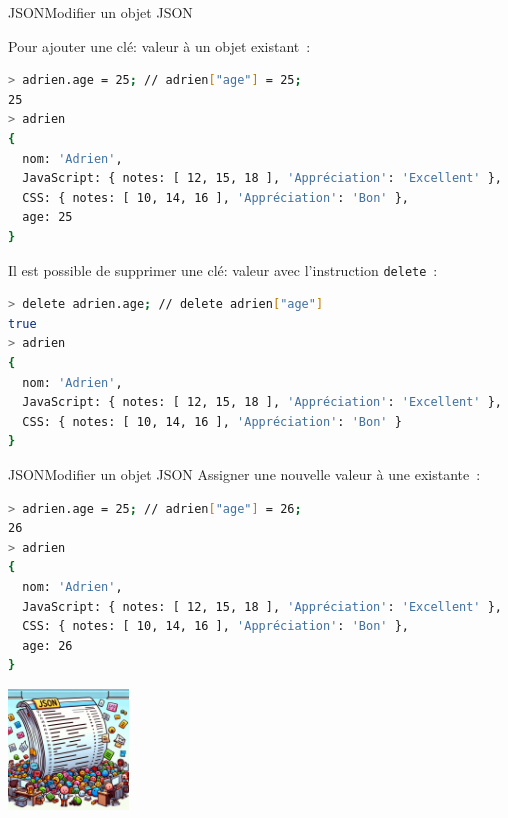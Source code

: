 \documentclass{beamer}
\begin{document}
    \begin{frame}[fragile]{JSON}{Modifier un objet JSON}
        \begin{footnotesize}
            Pour ajouter une clé: valeur à un objet existant~:
            \begin{lstlisting}[language=Bash,title={\scriptsize{Node.js}},basicstyle=\tiny\ttfamily]
> adrien.age = 25; // adrien["age"] = 25;
25
> adrien
{
  nom: 'Adrien',
  JavaScript: { notes: [ 12, 15, 18 ], 'Appréciation': 'Excellent' },
  CSS: { notes: [ 10, 14, 16 ], 'Appréciation': 'Bon' },
  age: 25
}
            \end{lstlisting}
            Il est possible de supprimer une clé: valeur avec l'instruction \lstinline{delete}~:
            \begin{lstlisting}[language=Bash,title={\scriptsize{Node.js}},basicstyle=\tiny\ttfamily]
> delete adrien.age; // delete adrien["age"]
true
> adrien
{
  nom: 'Adrien',
  JavaScript: { notes: [ 12, 15, 18 ], 'Appréciation': 'Excellent' },
  CSS: { notes: [ 10, 14, 16 ], 'Appréciation': 'Bon' }
}
            \end{lstlisting}
        \end{footnotesize}
    \end{frame}

    \begin{frame}[fragile]{JSON}{Modifier un objet JSON}
        Assigner une nouvelle valeur à une existante~:
        \begin{lstlisting}[language=Bash,title={\scriptsize{Node.js}}]
> adrien.age = 25; // adrien["age"] = 26;
26
> adrien
{
  nom: 'Adrien',
  JavaScript: { notes: [ 12, 15, 18 ], 'Appréciation': 'Excellent' },
  CSS: { notes: [ 10, 14, 16 ], 'Appréciation': 'Bon' },
  age: 26
}
        \end{lstlisting}
        \begin{center}
            \includegraphics[width=3.2cm]{image/json-changing}
        \end{center}
    \end{frame}
\end{document}
